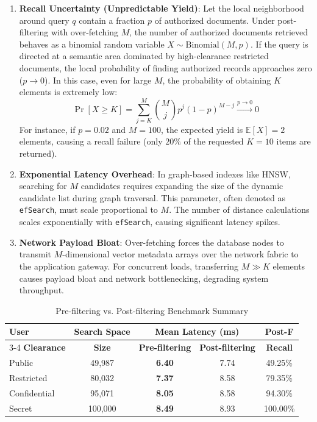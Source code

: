 \documentclass[sigconf]{acmart}
\begin{document}
\begin{enumerate}
    \item \textbf{Recall Uncertainty (Unpredictable Yield)}: Let the local neighborhood around query $q$ contain a fraction $p$ of authorized documents. Under post-filtering with over-fetching $M$, the number of authorized documents retrieved behaves as a binomial random variable $X \sim \text{Binomial}(M, p)$. If the query is directed at a semantic area dominated by high-clearance restricted documents, the local probability of finding authorized records approaches zero ($p \rightarrow 0$). In this case, even for large $M$, the probability of obtaining $K$ elements is extremely low:
    \begin{equation}
        \Pr[X \ge K] = \sum_{j=K}^{M} \binom{M}{j} p^j (1-p)^{M-j} \xrightarrow{p \rightarrow 0} 0
    \end{equation}
    For instance, if $p = 0.02$ and $M=100$, the expected yield is $\mathbb{E}[X] = 2$ elements, causing a recall failure (only $20\%$ of the requested $K=10$ items are returned).
    
    \item \textbf{Exponential Latency Overhead}: In graph-based indexes like HNSW, searching for $M$ candidates requires expanding the size of the dynamic candidate list during graph traversal. This parameter, often denoted as \texttt{efSearch}, must scale proportional to $M$. The number of distance calculations scales exponentially with \texttt{efSearch}, causing significant latency spikes.
    
    \item \textbf{Network Payload Bloat}: Over-fetching forces the database nodes to transmit $M$-dimensional vector metadata arrays over the network fabric to the application gateway. For concurrent loads, transferring $M \gg K$ elements causes payload bloat and network bottlenecking, degrading system throughput.
\end{enumerate}


\begin{table}[h]
\centering
\caption{Pre-filtering vs. Post-filtering Benchmark Summary}
\label{tab:pruning_results}
\begin{tabular}{lcccc}
\toprule
\textbf{User} & \textbf{Search Space} & \multicolumn{2}{c}{\textbf{Mean Latency (ms)}} & \textbf{Post-F} \\
\cmidrule(r){3-4}
\textbf{Clearance} & \textbf{Size} & \textbf{Pre-filtering} & \textbf{Post-filtering} & \textbf{Recall} \\
\midrule
Public       & 49,987  & \textbf{6.40} & 7.74 & 49.25\% \\
Restricted   & 80,032  & \textbf{7.37} & 8.58 & 79.35\% \\
Confidential & 95,071  & \textbf{8.05} & 8.58 & 94.30\% \\
Secret       & 100,000 & \textbf{8.49} & 8.93 & 100.00\% \\
\bottomrule
\end{tabular}
\end{table}
\end{document}
